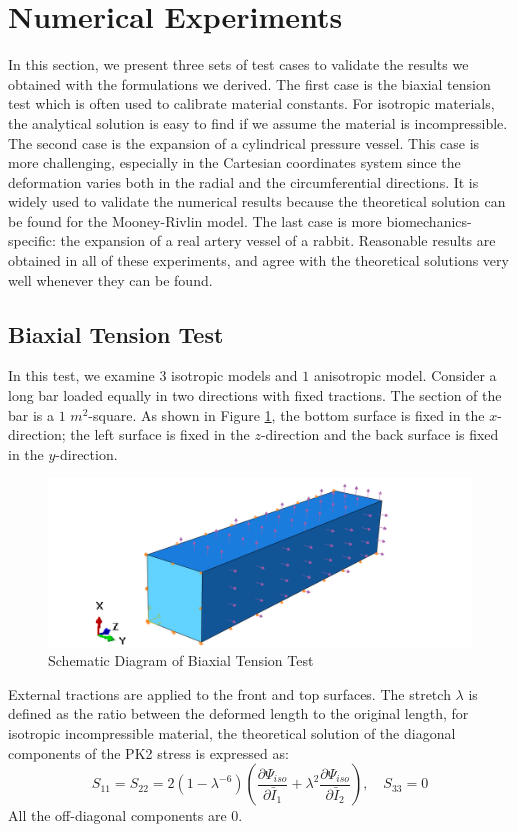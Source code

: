 \section{Numerical Experiments}
In this section, we present three sets of test cases to validate the results we obtained with the formulations we derived. The first case is the biaxial tension test which is often used to calibrate material constants. For isotropic materials, the analytical solution is easy to find if we assume the material is incompressible. The second case is the expansion of a cylindrical pressure vessel. This case is more challenging, especially in the Cartesian coordinates system since the deformation varies both in the radial and the circumferential directions. It is widely used to validate the numerical results because the theoretical solution can be found for the Mooney-Rivlin model. The last case is more biomechanics-specific: the expansion of a real artery vessel of a rabbit. Reasonable results are obtained in all of these experiments, and agree with the theoretical solutions very well whenever they can be found.

\subsection{Biaxial Tension Test}
\label{biaxial_tension_test}
In this test, we examine $3$ isotropic models and $1$ anisotropic model. Consider a long bar loaded equally in two directions with fixed tractions. The section of the bar is a $1$ $m^2$-square. As shown in Figure \ref{fig:biaxial_schematic}, the bottom surface is fixed in the $x$-direction; the left surface is fixed in the $z$-direction and the back surface is fixed in the $y$-direction. 

\begin{figure}[H]
\centering
\includegraphics[width=.8\textwidth]{./figures/biaxial_schematic2.png}
\caption{Schematic Diagram of Biaxial Tension Test}
\label{fig:biaxial_schematic}
\end{figure}


External tractions are applied to the front and top surfaces. The stretch $\lambda$ is defined as the ratio between the deformed length to the original length, for isotropic incompressible material, the theoretical solution of the diagonal components of the PK2 stress is expressed as:
\begin{equation} \label{biaxialPK2}
S_{11} = S_{22} = 2(1 - {\lambda}^{-6})(\frac{\partial\Psi_{iso}}{\partial\bar{I}_1} + {\lambda}^2\frac{\partial\Psi_{iso}}{\partial\bar{I}_2}), \quad S_{33} = 0
\end{equation}
All the off-diagonal components are $0$.

